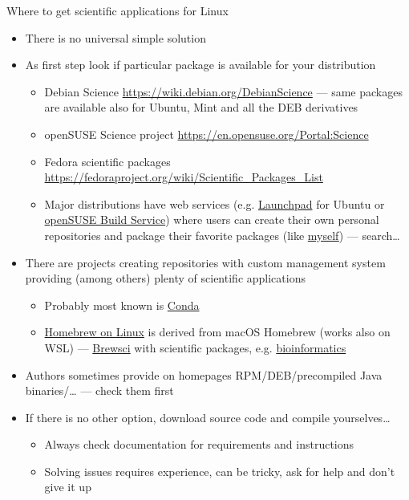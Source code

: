 \documentclass[compress, xelatex, 11pt, xcolor=svgnames, aspectratio=169,
	hyperref={
		bookmarks=true,
		unicode=true,
		colorlinks=true,
		pdftitle={Linux, command line and MetaCentrum},
		plainpages=false,
		pdfauthor={Vojtech Zeisek},
		pdfsubject={Course about use of Linux command line, writing shell scripts and using MetaCentrum of CESNET},
		pdfcreator={XeLaTeX},
		pdfkeywords={Linux, GNU, BASH, shell, command line, MetaCentrum},
		linkcolor=DarkRed, %
		anchorcolor=DarkBlue, %
		citecolor=Indigo, %
		filecolor=NavyBlue, %
		menucolor=DarkMagenta, %
		urlcolor=DarkBlue, %
		},
	url={hyphens, lowtilde} %
	]{beamer}
\begin{document}
\begin{frame}[allowframebreaks]{Where to get scientific applications for Linux}
	\begin{itemize}
		\item There is no universal simple solution
		\item As first step look if particular package is available for your distribution
		\begin{itemize}
			\item Debian Science \url{https://wiki.debian.org/DebianScience} --- same packages are available also for Ubuntu, Mint and all the DEB derivatives
			\item openSUSE Science project \url{https://en.opensuse.org/Portal:Science}
			\item Fedora scientific packages \url{https://fedoraproject.org/wiki/Scientific_Packages_List}
			\item Major distributions have web services (e.g. \href{https://launchpad.net/}{Launchpad} for Ubuntu or \href{https://build.opensuse.org/}{openSUSE Build Service}) where users can create their own personal repositories and package their favorite packages (like \href{https://build.opensuse.org/project/show/home:vojtaeus}{myself}) --- search\ldots
		\end{itemize}
		\item There are projects creating repositories with custom management system providing (among others) plenty of scientific applications
		\begin{itemize}
			\item Probably most known is \href{https://docs.conda.io/}{Conda}
			\item \href{https://docs.brew.sh/Homebrew-on-Linux}{Homebrew on Linux} is derived from macOS Homebrew (works also on WSL) --- \href{https://github.com/brewsci}{Brewsci} with scientific packages, e.g. \href{https://brewsci.github.io/homebrew-bio/}{bioinformatics}
		\end{itemize}
		\item Authors sometimes provide on homepages RPM/DEB/precompiled Java binaries/\ldots{ }--- check them first
		\item If there is no other option, download source code and compile yourselves\ldots
		\begin{itemize}
			\item Always check documentation for requirements and instructions
			\item Solving issues requires experience, can be tricky, ask for help and don't give it up

\end{itemize}
\end{itemize}
\end{frame}
\end{document}

